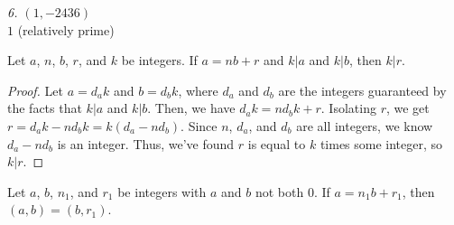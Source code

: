 \documentclass[../main.tex]{subfiles}
\begin{document}
\hspace*{5mm} \emph{6. $(1, -2436)$} \\
\hspace*{15mm} $1$ (relatively prime) \\



\begin{thm} \label{1.32}
  Let $a$, $n$, $b$, $r$, and $k$ be integers. If $a = nb + r$ and $k|a$ and $k|b$, then $k|r$.
\end{thm}

\begin{proof}
  Let $a = d_ak$ and $b=d_bk$, where $d_a$ and $d_b$ are the integers guaranteed by the facts that $k|a$ and $k|b$.
  Then, we have $d_ak = nd_bk + r$. Isolating $r$, we get $r = d_ak - nd_bk = k(d_a - nd_b)$. Since $n$, $d_a$, and $d_b$ are all integers, we know $d_a - nd_b$ is an integer. Thus, we've found $r$ is equal to $k$ times some integer, so $k|r$.
\end{proof}



\pagebreak



\begin{thm} \label{1.33}
  Let $a$, $b$, $n_1$, and $r_1$ be integers with $a$ and $b$ not both $0$. If $a = n_1b + r_1$, then $(a,b) = (b,r_1)$.
\end{thm}
\end{document}
